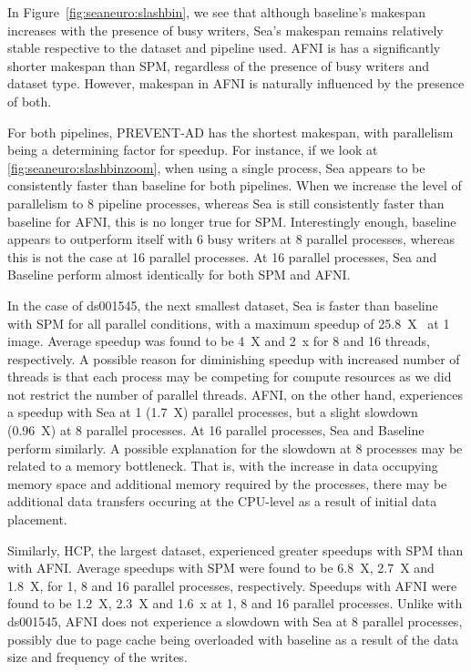 In Figure~\ref{fig:seaneuro:slashbin}, we see that although baseline's makespan increases with the presence of busy writers,
Sea's makespan remains relatively stable respective to the dataset and pipeline used. AFNI is has a significantly shorter makespan
than SPM, regardless of the presence of busy writers and dataset type. However, makespan in AFNI is naturally influenced by the presence of both.

For both pipelines, PREVENT-AD has the shortest makespan, with parallelism being a determining factor for speedup. For instance, if we look
at \ref{fig:seaneuro:slashbinzoom}, when using a single process, Sea appears to be consistently faster than baseline for both pipelines.
When we increase the level of parallelism to 8 pipeline processes, whereas Sea is still consistently faster than baseline for AFNI, this
is no longer true for SPM. Interestingly enough, baseline appears to outperform itself with 6 busy writers at 8 parallel processes, whereas
this is not the case at 16 parallel processes. At 16 parallel processes, Sea and Baseline perform almost identically for both SPM and AFNI.

In the case of ds001545, the next smallest dataset, Sea is faster than baseline with SPM for all parallel conditions, with a maximum speedup of 25.8~X~ at 1 image.
Average speedup was found to be 4~X and 2~x for 8 and 16 threads, respectively. A possible reason for diminishing speedup with increased number of 
threads is that each process may be competing for compute resources as we did not restrict the number of parallel threads.
AFNI, on the other hand, experiences a speedup with Sea at 1 (1.7~X) parallel processes, but a slight slowdown (0.96~X) at 8 parallel processes.
At 16 parallel processes, Sea and Baseline perform similarly. A possible explanation for the slowdown at 8 processes may be related to a memory bottleneck. That is, with the increase in data occupying memory space and additional memory required by the processes, there may be additional data transfers occuring at the CPU-level as a result of initial data placement.

Similarly, HCP, the largest dataset, experienced greater speedups with SPM than with AFNI. Average speedups with
SPM were found to be 6.8~X, 2.7~X and 1.8~X, for 1, 8 and 16 parallel processes, respectively. Speedups with AFNI
were found to be 1.2~X, 2.3~X and 1.6~x at 1, 8 and 16 parallel processes. Unlike with ds001545, AFNI does not experience a slowdown with Sea at 8 parallel processes, possibly due to page cache being overloaded with baseline as a result of the data size and frequency of the writes.



